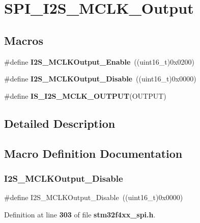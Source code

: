 \section{S\+P\+I\+\_\+\+I2\+S\+\_\+\+M\+C\+L\+K\+\_\+\+Output}
\label{group__SPI__I2S__MCLK__Output}
\subsection*{Macros}
\begin{DoxyCompactItemize}
\item 
\#define \textbf{ I2\+S\+\_\+\+M\+C\+L\+K\+Output\+\_\+\+Enable}~((uint16\+\_\+t)0x0200)
\item 
\#define \textbf{ I2\+S\+\_\+\+M\+C\+L\+K\+Output\+\_\+\+Disable}~((uint16\+\_\+t)0x0000)
\item 
\#define \textbf{ I\+S\+\_\+\+I2\+S\+\_\+\+M\+C\+L\+K\+\_\+\+O\+U\+T\+P\+UT}(O\+U\+T\+P\+UT)
\end{DoxyCompactItemize}


\subsection{Detailed Description}


\subsection{Macro Definition Documentation}
\mbox{\label{group__SPI__I2S__MCLK__Output_gaea09824d7e6359924152277ed3661e7e}} 
\subsubsection{I2\+S\+\_\+\+M\+C\+L\+K\+Output\+\_\+\+Disable}
{\footnotesize\ttfamily \#define I2\+S\+\_\+\+M\+C\+L\+K\+Output\+\_\+\+Disable~((uint16\+\_\+t)0x0000)}



Definition at line \textbf{ 303} of file \textbf{ stm32f4xx\+\_\+spi.\+h}.

